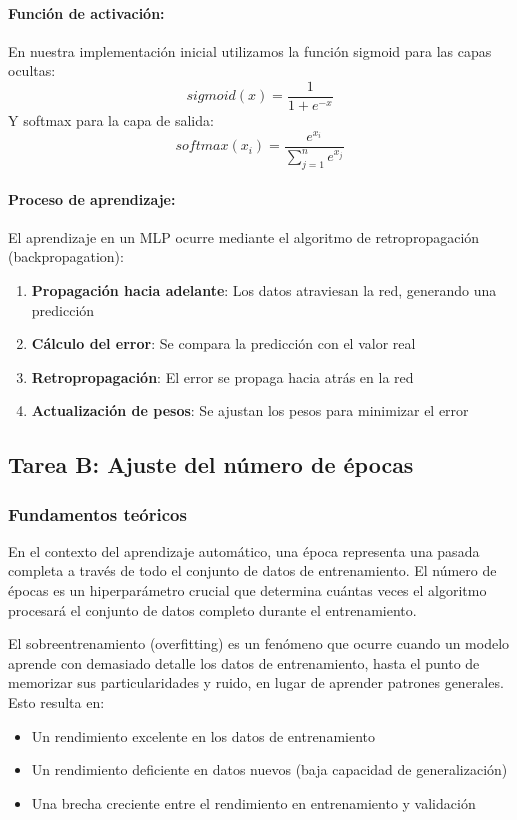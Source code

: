 \documentclass[11pt,a4paper]{article}
\begin{document}
\paragraph{Función de activación:}
En nuestra implementación inicial utilizamos la función sigmoid para las capas ocultas:
\[ sigmoid(x) = \frac{1}{1 + e^{-x}} \]
Y softmax para la capa de salida:
\[ softmax(x_i) = \frac{e^{x_i}}{\sum_{j=1}^{n} e^{x_j}} \]

\paragraph{Proceso de aprendizaje:}
El aprendizaje en un MLP ocurre mediante el algoritmo de retropropagación (backpropagation):
\begin{enumerate}
    \item \textbf{Propagación hacia adelante}: Los datos atraviesan la red, generando una predicción
    \item \textbf{Cálculo del error}: Se compara la predicción con el valor real
    \item \textbf{Retropropagación}: El error se propaga hacia atrás en la red
    \item \textbf{Actualización de pesos}: Se ajustan los pesos para minimizar el error
\end{enumerate}

\subsection{Tarea B: Ajuste del número de épocas}

\subsubsection{Fundamentos teóricos}
En el contexto del aprendizaje automático, una época representa una pasada completa a través de todo el conjunto de datos de entrenamiento. El número de épocas es un hiperparámetro crucial que determina cuántas veces el algoritmo procesará el conjunto de datos completo durante el entrenamiento.

El sobreentrenamiento (overfitting) es un fenómeno que ocurre cuando un modelo aprende con demasiado detalle los datos de entrenamiento, hasta el punto de memorizar sus particularidades y ruido, en lugar de aprender patrones generales. Esto resulta en:

\begin{itemize}
	\item Un rendimiento excelente en los datos de entrenamiento
	\item Un rendimiento deficiente en datos nuevos (baja capacidad de generalización)
	\item Una brecha creciente entre el rendimiento en entrenamiento y validación
\end{itemize}
\end{document}
